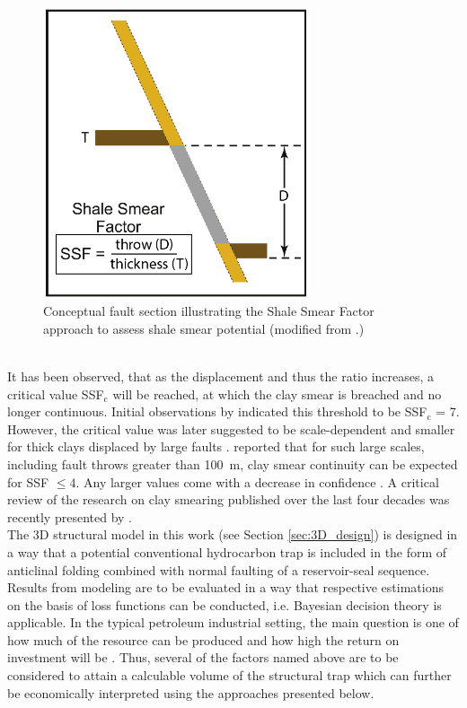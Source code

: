 		\begin{figure}[h]
			\centering
			\includegraphics[width=0.7\textwidth]{Figures/SSF.PNG}
			\caption{Conceptual fault section illustrating the Shale Smear Factor approach to assess shale smear potential (modified from \citet{vrolijk2016clay}.)}\label{fig:ssf}
		\end{figure}\\
		It has been observed, that as the displacement and thus the ratio increases, a critical value SSF$_\text{c}$ will be reached, at which the clay smear is breached and no longer continuous. Initial observations by \citet{lindsay1993outcrop} indicated this threshold to be SSF$_\text{c}$ = 7. However, the critical value was later suggested to be scale-dependent and smaller for thick clays displaced by large faults \citep{yielding2012using}. \citet{faerseth2006shale} reported that for such large scales, including fault throws greater than 100~m, clay smear continuity can be expected for SSF $\le4$. Any larger values come with a decrease in confidence \citep{faerseth2006shale}. A critical review of the research on clay smearing published over the last four decades was recently presented by \citet{vrolijk2016clay}.\\
        The 3D structural model in this work (see Section \ref{sec:3D_design}) is designed in a way that a potential conventional hydrocarbon trap is included in the form of anticlinal folding combined with normal faulting of a reservoir-seal sequence. Results from modeling are to be evaluated in a way that respective estimations on the basis of loss functions can be conducted, i.e. Bayesian decision theory is applicable. In the typical petroleum industrial setting, the main question is one of how much of the resource can be produced and how high the return on investment will be \citep{dean2007volumetric}. Thus, several of the factors named above are to be considered to attain a calculable volume of the structural trap which can further be economically interpreted using the approaches presented below.
        
